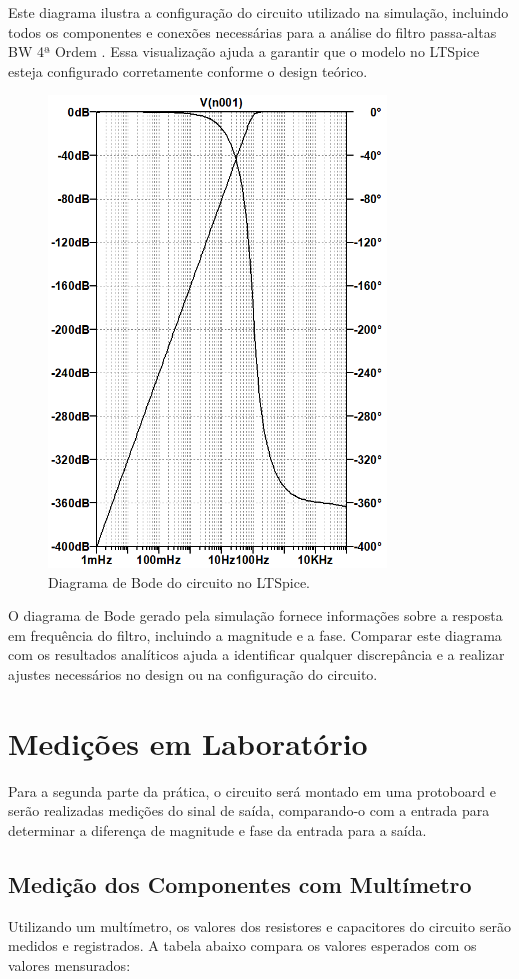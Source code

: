 \documentclass[
	12pt,				%
	openright,			%
	twoside,			%
	a4paper,			%
	english,			%
	french,				%
	spanish,			%
	brazil,				%
	]{abntex2}
\begin{document}
Este diagrama ilustra a configuração do circuito utilizado na simulação, incluindo todos os componentes e conexões necessárias para a análise do filtro passa-altas BW 4ª Ordem . Essa visualização ajuda a garantir que o modelo no LTSpice esteja configurado corretamente conforme o design teórico.

\begin{figure}[H]
    \centering
    \includegraphics[width=0.8\textwidth,height=0.45\textwidth]{imgs/bode_ltspice.png}
    \caption{Diagrama de Bode do circuito no LTSpice.}
    \label{fig:first_circuit_ltspice_bode}
\end{figure}


O diagrama de Bode gerado pela simulação fornece informações sobre a resposta em frequência do filtro, incluindo a magnitude e a fase. Comparar este diagrama com os resultados analíticos ajuda a identificar qualquer discrepância e a realizar ajustes necessários no design ou na configuração do circuito.



\pagebreak

\chapter{Medições em Laboratório}

Para a segunda parte da prática, o circuito será montado em uma protoboard e serão realizadas medições do sinal de saída, comparando-o com a entrada para determinar a diferença de magnitude e fase da entrada para a saída.

\section{Medição dos Componentes com Multímetro}

Utilizando um multímetro, os valores dos resistores e capacitores do circuito serão medidos e registrados. A tabela abaixo compara os valores esperados com os valores mensurados:
\end{document}
